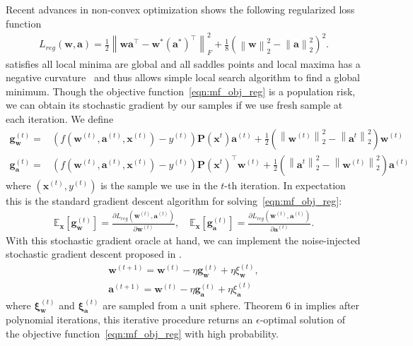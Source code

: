 \documentclass[11pt]{article}
\newcommand{\mat}[1]{\mathbf{#1}}
\newcommand{\vect}[1]{\mathbf{#1}}
\newcommand{\norm}[1]{\left\|#1\right\|}
\newcommand{\expect}{\mathbb{E}}
\begin{document}
Recent advances in non-convex optimization shows the following regularized loss function
\begin{align}
	L_{reg}\left(\vect{w},\vect{a}\right) = \frac{1}{2}\norm{\vect{w}\vect{a}^\top - \vect{w}^*\left(\vect{a}^*\right)^\top}_F^2 +
	\frac{1}{8}\left(\norm{\vect{w}}_2^2-\norm{\vect{a}}_2^2\right)^2.
	\label{eqn:mf_obj_reg}
\end{align}
satisfies all local minima are global and all saddles points and local maxima has a negative curvature~\cite{ge2017no} and thus allows simple local search algorithm to find a global minimum.
Though the objective function~\eqref{eqn:mf_obj_reg} is a population risk, we can obtain its stochastic gradient by our samples if we use fresh sample at each iteration.
We define \begin{align}
	\vect{g}_\vect{w}^{(t)} = & \left(f\left(\vect{w}^{(t)},\vect{a}^{(t)},\vect{x}^{(t)}\right)-y^{(t)}\right)\mat{P}\left(\vect{x}^{t}\right)\vect{a}^{(t)} + \frac{1}{2}\left(\norm{\vect{w}^{(t)}}_2^2-\norm{\vect{a}^{t}}_2^2\right)\vect{w}^{(t)} \label{eqn:w_sg_oracle}\\
	\vect{g}_\vect{a}^{(t)} = &\left(f\left(\vect{w}^{(t)},\vect{a}^{(t)},\vect{x}^{(t)}\right)-y^{(t)}\right)\mat{P}\left(\vect{x}^{t}\right)^\top\vect{w}^{(t)} +
	\frac{1}{2}\left(\norm{\vect{a}^{t}}_2^2-\norm{\vect{w}^{(t)}}_2^2\right)\vect{a}^{(t)} \label{eqn:a_sg_oracle}
\end{align}
where $\left(\vect{x}^{(t)},y^{(t)}\right)$ is the sample we use in the $t$-th iteration.
In expectation this is the standard gradient descent algorithm for solving~\eqref{eqn:mf_obj_reg}:
\begin{align*}
	\expect_{\vect{x}}\left[\vect{g}_\vect{w}^{(t)} \right] = \frac{\partial L_{reg}\left(\vect{w}^{(t)},\vect{a}^{(t)}\right)}{\partial \vect{w}^{(t)}}, \quad
	\expect_{\vect{x}}\left[\vect{g}_\vect{a}^{(t)} \right] = \frac{\partial L_{reg}\left(\vect{w}^{(t)},\vect{a}^{(t)}\right)}{\partial \vect{a}^{(t)}}.
\end{align*}
With this stochastic gradient oracle at hand, we can implement the noise-injected stochastic gradient descent proposed in \cite{ge2015escaping}.
\begin{align*}
	\vect{w}^{(t+1)} = \vect{w}^{(t)} - \eta \vect{g}_\vect{w}^{(t)}  +\eta\xi_{\vect{w}}^{(t)}, \\ 
	\vect{a}^{(t+1)} = \vect{w}^{(t)} - \eta \vect{g}_\vect{a}^{(t)} + \eta\xi_{\vect{a}}^{(t)}
\end{align*}
where $\vect{\xi}_{\vect{w}}^{(t)}$ and $\vect{\xi}_{\vect{a}}^{(t)}$ are sampled from a unit sphere.
Theorem 6 in \cite{ge2015escaping} implies after polynomial iterations, this iterative procedure returns an $\epsilon$-optimal solution of the objective function~\eqref{eqn:mf_obj_reg} with high probability.
\end{document}
